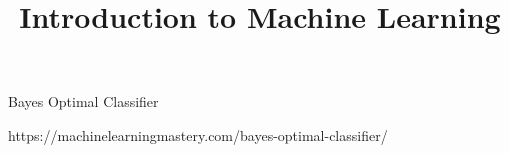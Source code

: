 




\newcommand{\titlefigure}{figure_man/optimization_steps.jpeg}
\newcommand{\learninggoals}{
\item Understand what the Bayes optimal model is
\item Derive the point-wise optimizers of different loss functions
\item Derivce the optimal constant models 
}

\title{Introduction to Machine Learning}
\date{}





\begin{vbframe}{Bayes Optimal Classifier}


https://machinelearningmastery.com/bayes-optimal-classifier/

\end{vbframe}




